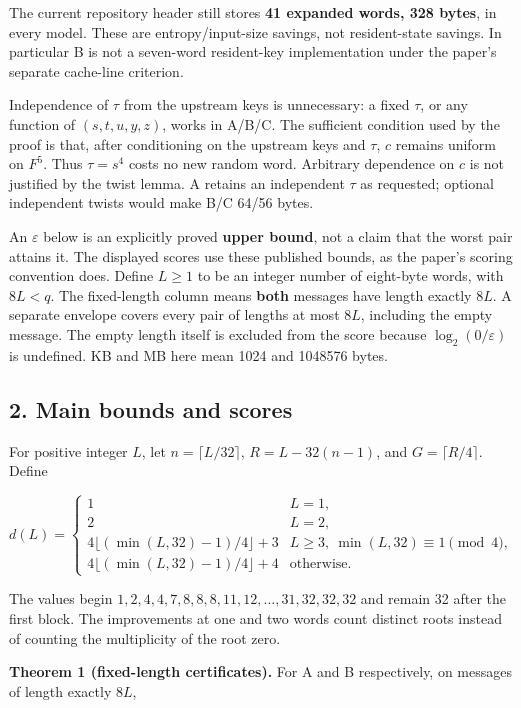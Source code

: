 \documentclass[
  11pt,
]{article}
\begin{document}
The current repository header still stores \textbf{41 expanded words,
328 bytes}, in every model. These are entropy/input-size savings, not
resident-state savings. In particular B is not a seven-word resident-key
implementation under the paper's separate cache-line criterion.

Independence of \(\tau\) from the upstream keys is unnecessary: a fixed
\(\tau\), or any function of \((s,t,u,y,z)\), works in A/B/C. The
sufficient condition used by the proof is that, after conditioning on
the upstream keys and \(\tau\), \(c\) remains uniform on \(F^5\). Thus
\(\tau=s^4\) costs no new random word. Arbitrary dependence on \(c\) is
not justified by the twist lemma. A retains an independent \(\tau\) as
requested; optional independent twists would make B/C 64/56 bytes.

An \(\varepsilon\) below is an explicitly proved \textbf{upper bound},
not a claim that the worst pair attains it. The displayed scores use
these published bounds, as the paper's scoring convention does. Define
\(L\ge1\) to be an integer number of eight-byte words, with \(8L<q\).
The fixed-length column means \textbf{both} messages have length exactly
\(8L\). A separate envelope covers every pair of lengths at most \(8L\),
including the empty message. The empty length itself is excluded from
the score because \(\log_2(0/\varepsilon)\) is undefined. KB and MB here
mean 1024 and 1048576 bytes.

\subsection{2. Main bounds and scores}\label{main-bounds-and-scores}

For positive integer \(L\), let \(n=\lceil L/32\rceil\),
\(R=L-32(n-1)\), and \(G=\lceil R/4\rceil\). Define

\[
 d(L)=\begin{cases}
 1&L=1,\\
 2&L=2,\\
 4\lfloor(\min(L,32)-1)/4\rfloor+3&L\ge3,\ \min(L,32)\equiv1\pmod4,\\
 4\lfloor(\min(L,32)-1)/4\rfloor+4&\text{otherwise}.
 \end{cases}
\]

The values begin \(1,2,4,4,7,8,8,8,11,12,\ldots,31,32,32,32\) and remain
32 after the first block. The improvements at one and two words count
distinct roots instead of counting the multiplicity of the root zero.

\textbf{Theorem 1 (fixed-length certificates).} For A and B
respectively, on messages of length exactly \(8L\),
\end{document}
